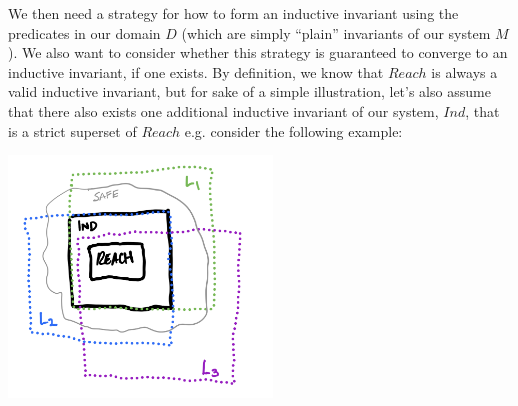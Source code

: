 \documentclass[10pt]{article}
\begin{document}
We then need a strategy for how to form an inductive invariant using the predicates in our domain $D$ (which are simply ``plain'' invariants of our system $M$). We also want to consider whether this strategy is guaranteed to converge to an inductive invariant, if one exists. By definition, we know that $Reach$ is always a valid inductive invariant, but for sake of a simple illustration, let's also assume that there also exists one additional inductive invariant of our system, $Ind$, that is a strict superset of $Reach$ e.g. consider the following example:
\begin{center}
    \includegraphics[width=70mm]{invs1.png}  
\end{center}
\end{document}
